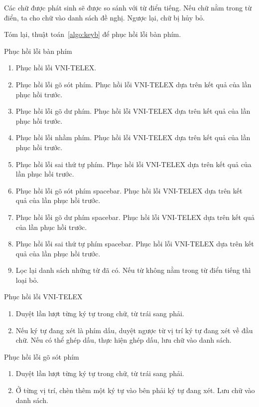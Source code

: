\documentclass[a4paper,oneside,14pt]{extbook} %
\begin{document}

Các chữ được phát sinh sẽ được so sánh với từ điển tiếng. Nếu chữ nằm trong từ
điển, ta cho chữ vào danh sách đề nghị. Ngược lại, chữ bị hủy bỏ.

Tóm lại, thuật toán~\ref{algo:keyb} để phục hồi lỗi bàn phím.
\begin{algo}
\caption{Phục hồi lỗi bàn phím}
\label{algo:keyb}
  \begin{enumerate}
  \item Phục hồi lỗi VNI-TELEX.
  \item Phục hồi lỗi gõ sót phím. Phục hồi lỗi VNI-TELEX dựa trên kết
    quả của lần phục hồi trước.
  \item Phục hồi lỗi gõ dư phím. Phục hồi lỗi VNI-TELEX dựa trên kết
    quả của lần phục hồi trước.
  \item Phục hồi lỗi nhầm phím. Phục hồi lỗi VNI-TELEX dựa trên kết
    quả của lần phục hồi trước.
  \item Phục hồi lỗi sai thứ tự phím. Phục hồi lỗi VNI-TELEX dựa trên kết
    quả của lần phục hồi trước.
  \item Phục hồi lỗi gõ sót phím spacebar. Phục hồi lỗi VNI-TELEX dựa trên kết
    quả của lần phục hồi trước.
  \item Phục hồi lỗi gõ dư phím spacebar. Phục hồi lỗi VNI-TELEX dựa trên kết
    quả của lần phục hồi trước.
  \item Phục hồi lỗi sai thứ tự phím spacebar. Phục hồi lỗi VNI-TELEX dựa trên kết
    quả của lần phục hồi trước.
  \item Lọc lại danh sách những từ đã có. Nếu từ không nằm trong từ
    điển tiếng thì loại bỏ.
  \end{enumerate}
\end{algo}

\begin{algo}\caption{Phục hồi lỗi VNI-TELEX}
  \begin{enumerate}
  \item Duyệt lần lượt từng ký tự trong chữ, từ trái sang phải.
  \item Nếu ký tự đang xét là phím dấu, duyệt ngược từ vị trí ký tự
    đang xét về đầu chữ. Nếu có thể ghép dấu, thực hiện ghép dấu, lưu
    chữ vào danh sách. 
  \end{enumerate}
\end{algo}

\begin{algo}\caption{Phục hồi lỗi gõ sót phím}
  \begin{enumerate}
  \item Duyệt lần lượt từng ký tự trong chữ, từ trái sang phải.
  \item Ở từng vị trí, chèn thêm một ký tự vào bên phải ký tự đang
    xét. Lưu chữ vào danh sách.
  \end{enumerate}
\end{algo}
\end{document}
